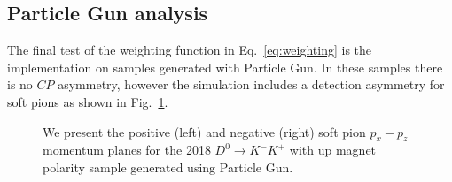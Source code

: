 \documentclass{article}
\begin{document}
        \subsection{Particle Gun analysis}
        The final test of the weighting function in Eq.~\ref{eq:weighting} is the implementation on samples generated with Particle Gun.
        In these samples there is no $CP$ asymmetry, however the simulation includes a detection asymmetry for soft pions as shown in Fig.~\ref{fig:detection_pgun}.
        \begin{figure}[h!]
                \centering
                \caption{We present the positive (left) and negative (right) soft pion $p_x - p_z$ momentum planes for the 2018 $D^0\to K^-K^+$ with up magnet polarity sample generated using Particle Gun.}
                \label{fig:detection_pgun}
        \end{figure}
\end{document}
